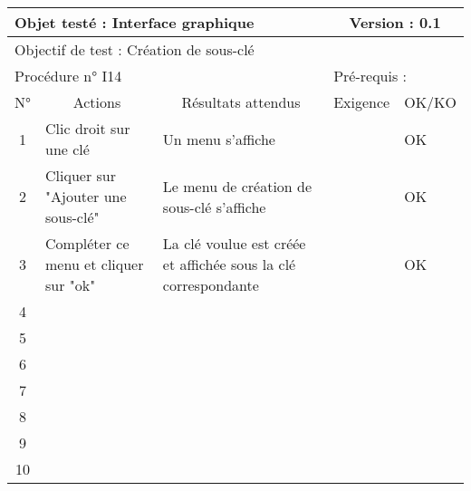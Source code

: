 \documentclass{../res/univ-projet}
\begin{document}
\begin{center}
    \begin{tabular}{|c|p{5cm}|p{5cm}|p{1.5cm}|p{1.5cm}|}
      \hline
      \multicolumn{3}{|l|}{Objet testé : Interface graphique} & \multicolumn{2}{c|}{Version : 0.1}\\ \hline
      \multicolumn{5}{|l|}{Objectif de test : Création de sous-clé}\\ \hline
      \multicolumn{3}{|l|}{Procédure n° I14} & \multicolumn{2}{p{3cm}|}{Pré-requis : }\\ \hline
      \multicolumn{1}{|c|}{N°} & \multicolumn{1}{c|}{Actions} & \multicolumn{1}{c|}{Résultats attendus} & 
      \multicolumn{1}{c|}{Exigence} & \multicolumn{1}{c|}{OK/KO}\\ \hline
      1 & Clic droit sur une clé & Un menu s'affiche &  & OK \\
      2 & Cliquer sur "Ajouter une sous-clé" & Le menu de création de sous-clé s'affiche &  & OK\\
      3 & Compléter ce menu et cliquer sur "ok" & La clé voulue est créée et affichée sous la clé correspondante &  & OK\\ 
      4 &  &  &  & \\
      5 &  &  &  & \\
      6 &  &  &  & \\
      7 &  &  &  & \\
      8 &  &  &  & \\
      9 &  &  &  & \\
      10 &  &  &  &\\ 
	\hline
    \end{tabular}
    \vskip 2.2cm


\end{center}
\end{document}
